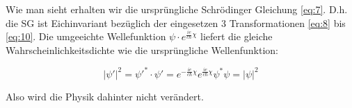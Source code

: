 Wie man sieht erhalten wir die ursprüngliche Schrödinger Gleichung \eqref{eq:7}. D.h. die SG ist Eichinvariant bezüglich der eingesetzen 3 Transformationen \eqref{eq:8} bis \eqref{eq:10}. Die umgeeichte Wellefunktion \(\psi \cdot e^{\frac{ie}{c\hbar}\chi}\) liefert die gleiche Wahrscheinlichkeitsdichte wie die ursprüngliche Wellenfunktion:

\[ |\psi'|^2 = \psi'^*\cdot\psi' = e^{-\frac{ie}{c\hbar}\chi}e^{\frac{ie}{c\hbar}\chi} \psi^*\psi = |\psi|^2\]

Also wird die Physik dahinter nicht verändert. 



